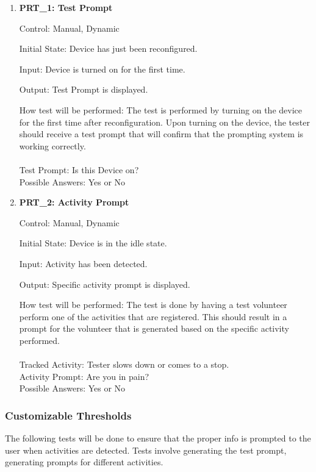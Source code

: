 \documentclass[12pt, titlepage]{article}
\begin{document}
\begin{enumerate}
	\item{\textbf{PRT\_1: Test Prompt} \\}\label{PRT1}
	
		Control: Manual, Dynamic
							
		Initial State: Device has just been reconfigured.
							
		Input: Device is turned on for the first time.
		
		Output: Test Prompt is displayed.

		How test will be performed: The test is performed by turning on the device for the first time after reconfiguration. Upon turning on the device, the tester should receive a test prompt that will confirm that the 				prompting system is working correctly.\\\\
		Test Prompt: Is this Device on?\\
		Possible Answers: Yes or No
		
	\item{\textbf{PRT\_2: Activity Prompt} \\}\label{PRT2}
	
		Control: Manual, Dynamic
							
		Initial State: Device is in the idle state.
							
		Input: Activity has been detected.
		
		Output: Specific activity prompt is displayed.
							
		How test will be performed: The test is done by having a test volunteer perform one of the activities that are registered. This should result in a prompt for the volunteer that is generated based on the 					specific activity performed.\\\\
		Tracked Activity: Tester slows down or comes to a stop.\\
		Activity Prompt: Are you in pain?\\
		Possible Answers: Yes or No
\end{enumerate}

\subsubsection{Customizable Thresholds}

The following tests will be done to ensure that the proper info is prompted to the user when activities are detected. Tests involve generating the test prompt, generating prompts for different activities.
		
\end{document}
